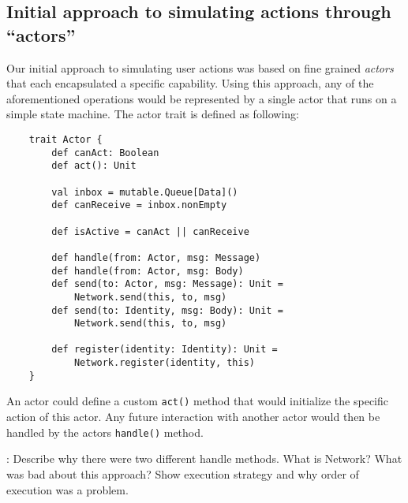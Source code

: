 \subsection{Initial approach to simulating actions through ``actors''}
Our initial approach to simulating user actions was based on fine grained \emph{actors} that each encapsulated a specific capability. 
Using this approach, any of the aforementioned operations would be represented by a single actor that runs on a simple state machine.
The actor trait is defined as following:
\begin{verbatim}
    trait Actor {
        def canAct: Boolean
        def act(): Unit
      
        val inbox = mutable.Queue[Data]()
        def canReceive = inbox.nonEmpty
      
        def isActive = canAct || canReceive
      
        def handle(from: Actor, msg: Message)
        def handle(from: Actor, msg: Body)
        def send(to: Actor, msg: Message): Unit = 
            Network.send(this, to, msg)
        def send(to: Identity, msg: Body): Unit = 
            Network.send(this, to, msg)
      
        def register(identity: Identity): Unit = 
            Network.register(identity, this)
    }
\end{verbatim}
An actor could define a custom \texttt{act()} method that would initialize the specific action of this actor. Any future interaction with another actor would then be handled by the actors \texttt{handle()} method. 

: Describe why there were two different handle methods. What is Network? What was bad about this approach? Show execution strategy and why order of execution was a problem.